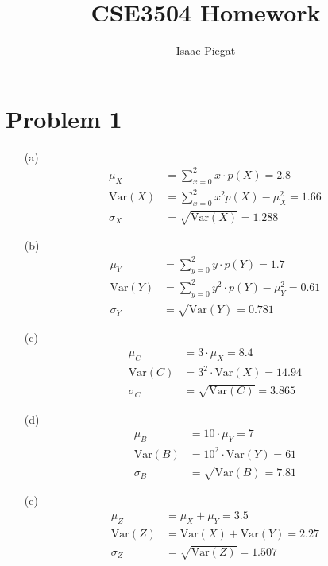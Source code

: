 \documentclass{article}
\title{CSE3504 Homework}
\author{Isaac Piegat}
\date{}
\begin{document}
\maketitle

\section*{Problem 1}
\begin{enumerate}
    \item[(a)] 
    \begin{align*}
        \mu_X &= \sum_{x=0}^2 x \cdot p(X) = 2.8 \\
        \text{Var}(X) &= \sum_{x=0}^2 x^2 p(X) - \mu_X^2 = 1.66 \\
        \sigma_X &= \sqrt{\text{Var}(X)} = 1.288
    \end{align*}

    \item[(b)]
    \begin{align*}
        \mu_Y &= \sum_{y=0}^2 y \cdot p(Y) = 1.7 \\
        \text{Var}(Y) &= \sum_{y=0}^2 y^2 \cdot p(Y) - \mu_Y^2 = 0.61 \\
        \sigma_Y &= \sqrt{\text{Var}(Y)} = 0.781
    \end{align*}

    \item[(c)]
    \begin{align*}
        \mu_C &= 3 \cdot \mu_X = 8.4 \\
        \text{Var}(C) &= 3^2 \cdot \text{Var}(X) = 14.94 \\
        \sigma_C &= \sqrt{\text{Var}(C)} = 3.865
    \end{align*}

    \item[(d)]
    \begin{align*}
        \mu_B &= 10 \cdot \mu_Y = 7 \\
        \text{Var}(B) &= 10^2 \cdot \text{Var}(Y) = 61 \\
        \sigma_B &= \sqrt{\text{Var}(B)} = 7.81
    \end{align*}

    \item[(e)]
    \begin{align*}
        \mu_Z &= \mu_X + \mu_Y = 3.5 \\
        \text{Var}(Z) &= \text{Var}(X) + \text{Var}(Y) = 2.27 \\
        \sigma_Z &= \sqrt{\text{Var}(Z)} = 1.507
    \end{align*}


\end{enumerate}
\end{document}
